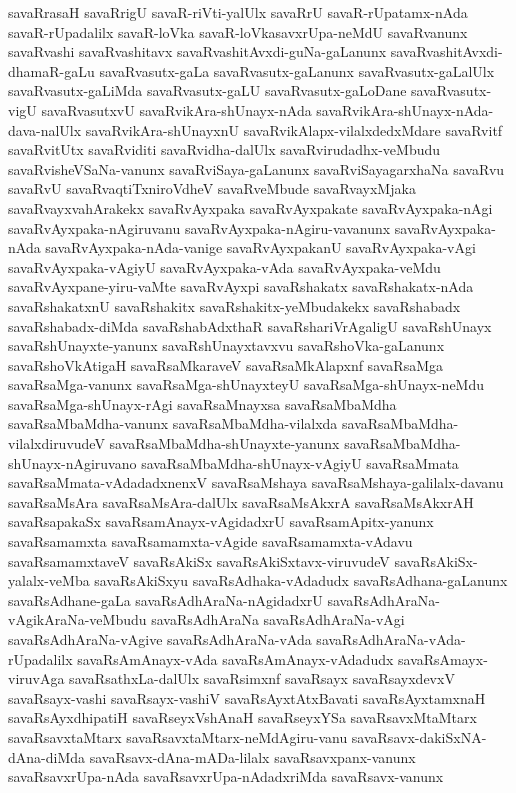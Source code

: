 {savaRrasaH
savaRrigU
savaR-riVti-yalUlx
savaRrU
savaR-rUpatamx-nAda
savaR-rUpadalilx
savaR-loVka
savaR-loVkasavxrUpa-neMdU
savaRvanunx
savaRvashi
savaRvashitavx
savaRvashitAvxdi-guNa-gaLanunx
savaRvashitAvxdi-dhamaR-gaLu
savaRvasutx-gaLa
savaRvasutx-gaLanunx
savaRvasutx-gaLalUlx
savaRvasutx-gaLiMda
savaRvasutx-gaLU
savaRvasutx-gaLoDane
savaRvasutx-vigU
savaRvasutxvU
savaRvikAra-shUnayx-nAda
savaRvikAra-shUnayx-nAda-dava-nalUlx
savaRvikAra-shUnayxnU
savaRvikAlapx-vilalxdedxMdare
savaRvitf
savaRvitUtx
savaRviditi
savaRvidha-dalUlx
savaRvirudadhx-veMbudu
savaRvisheVSaNa-vanunx
savaRviSaya-gaLanunx
savaRviSayagarxhaNa
savaRvu
savaRvU
savaRvaqtiTxniroVdheV
savaRveMbude
savaRvayxMjaka
savaRvayxvahArakekx
savaRvAyxpaka
savaRvAyxpakate
savaRvAyxpaka-nAgi
savaRvAyxpaka-nAgiruvanu
savaRvAyxpaka-nAgiru-vavanunx
savaRvAyxpaka-nAda
savaRvAyxpaka-nAda-vanige
savaRvAyxpakanU
savaRvAyxpaka-vAgi
savaRvAyxpaka-vAgiyU
savaRvAyxpaka-vAda
savaRvAyxpaka-veMdu
savaRvAyxpane-yiru-vaMte
savaRvAyxpi
savaRshakatx
savaRshakatx-nAda
savaRshakatxnU
savaRshakitx
savaRshakitx-yeMbudakekx
savaRshabadx
savaRshabadx-diMda
savaRshabAdxthaR
savaRshariVrAgaligU
savaRshUnayx
savaRshUnayxte-yanunx
savaRshUnayxtavxvu
savaRshoVka-gaLanunx
savaRshoVkAtigaH
savaRsaMkaraveV
savaRsaMkAlapxnf
savaRsaMga
savaRsaMga-vanunx
savaRsaMga-shUnayxteyU
savaRsaMga-shUnayx-neMdu
savaRsaMga-shUnayx-rAgi
savaRsaMnayxsa
savaRsaMbaMdha
savaRsaMbaMdha-vanunx
savaRsaMbaMdha-vilalxda
savaRsaMbaMdha-vilalxdiruvudeV
savaRsaMbaMdha-shUnayxte-yanunx
savaRsaMbaMdha-shUnayx-nAgiruvano
savaRsaMbaMdha-shUnayx-vAgiyU
savaRsaMmata
savaRsaMmata-vAdadadxnenxV
savaRsaMshaya
savaRsaMshaya-galilalx-davanu
savaRsaMsAra
savaRsaMsAra-dalUlx
savaRsaMsAkxrA
savaRsaMsAkxrAH
savaRsapakaSx
savaRsamAnayx-vAgidadxrU
savaRsamApitx-yanunx
savaRsamamxta
savaRsamamxta-vAgide
savaRsamamxta-vAdavu
savaRsamamxtaveV
savaRsAkiSx
savaRsAkiSxtavx-viruvudeV
savaRsAkiSx-yalalx-veMba
savaRsAkiSxyu
savaRsAdhaka-vAdadudx
savaRsAdhana-gaLanunx
savaRsAdhane-gaLa
savaRsAdhAraNa-nAgidadxrU
savaRsAdhAraNa-vAgikAraNa-veMbudu
savaRsAdhAraNa
savaRsAdhAraNa-vAgi
savaRsAdhAraNa-vAgive
savaRsAdhAraNa-vAda
savaRsAdhAraNa-vAda-rUpadalilx
savaRsAmAnayx-vAda
savaRsAmAnayx-vAdadudx
savaRsAmayx-viruvAga
savaRsathxLa-dalUlx
savaRsimxnf
savaRsayx
savaRsayxdevxV
savaRsayx-vashi
savaRsayx-vashiV
savaRsAyxtAtxBavati
savaRsAyxtamxnaH
savaRsAyxdhipatiH
savaRseyxVshAnaH
savaRseyxYSa
savaRsavxMtaMtarx
savaRsavxtaMtarx
savaRsavxtaMtarx-neMdAgiru-vanu
savaRsavx-dakiSxNA-dAna-diMda
savaRsavx-dAna-mADa-lilalx
savaRsavxpanx-vanunx
savaRsavxrUpa-nAda
savaRsavxrUpa-nAdadxriMda
savaRsavx-vanunx
}
